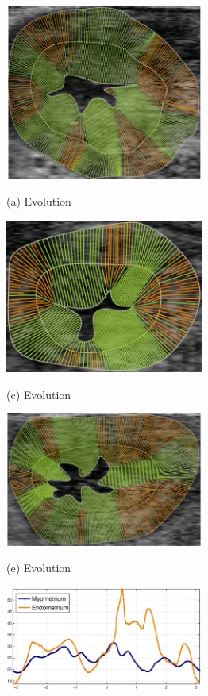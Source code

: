 \documentclass{article}
\begin{document}
\begin{figure}[t]
  \begin{minipage}[b]{.33\linewidth}
    \centering
    \centerline{\includegraphics[width=6.5cm]{pics/real}}
    \centerline{(a) Evolution}\medskip
  \end{minipage}
  \hfill
  \begin{minipage}[b]{.33\linewidth}
    \centering
    \centerline{\includegraphics[width=6.5cm]{pics/real4}}
    \centerline{(c) Evolution}\medskip
  \end{minipage}
  \hfill
  \begin{minipage}[b]{.33\linewidth}
    \centering
    \centerline{\includegraphics[width=6.5cm]{pics/real3}}
    \centerline{(e) Evolution}\medskip
  \end{minipage}
  \hfill
  \begin{minipage}[b]{.33\linewidth}
    \centering
    \centerline{\includegraphics[width=6.5cm]{pics/realWidth}}

\end{minipage}
\end{figure}
\end{document}
